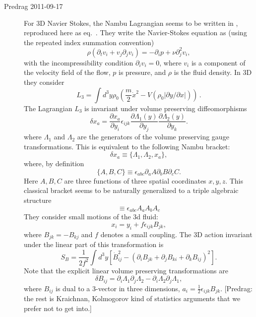 \begin{description}
\item[Predrag 2011-09-17 ]
For 3D Navier Stokes, the Nambu Lagrangian seems to be written in
, reproduced here as eq.~.
They write the Navier-Stokes equation as (using the repeated index summation convention)
\begin{equation}
\rho (\partial_t v_i + v_j \partial_j v_i) = - \partial_i p + \nu \partial_j^2 v_i,
\end{equation}
with the incompressibility condition $\partial_i v_i = 0$, where $v_i$ is
a component of the velocity field of the flow, $p$ is pressure, and
$\rho$ is the fluid density. In 3D they consider
\begin{equation}
L_3= \int d^3y \rho_0
\left( \frac{m}{2} \dot{x}^2 - V( \rho_0 |{ \partial y}/{\partial x}|) \right)
\,.
\label{MiPlSt11:Lagr}
\end{equation}
The Lagrangian $L_3$ is invariant under volume preserving diffeomorphisms
\begin{equation}
\delta x_a = \frac{\partial x_a}{\partial y_i}\epsilon_{ijk} \frac{\partial \Lambda_1(y)}{\partial y_j}
\frac{\partial \Lambda_2(y)}{\partial y_k}.
\end{equation}
where $\Lambda_1$ and $\Lambda_2$ are the generators of the volume preserving
gauge transformations.
This is equivalent to the following Nambu bracket:
\begin{equation}
\delta x_a \equiv \{\Lambda_1, \Lambda_2, x_a\},
\end{equation}
where, by definition
\begin{equation}
\{A, B, C\}\equiv \epsilon_{abc} \partial_a A \partial_b B \partial_c C.
\end{equation}
Here $A,B,C$ are three functions of three spatial coordinates $x,y,z$.
This classical bracket seems to be naturally generalized to a triple
algebraic structure %
\begin{equation}
[A_i, A_j, A_k] \equiv \epsilon_{abc} A_a A_b A_c
\end{equation}
They consider small motions of the 3d fluid:
\begin{equation}
x_i = y_i + f \epsilon_{ijk} B_{jk},
\end{equation}
where $B_{jk}= - B_{kj}$ and $f$ denotes a small coupling.
The 3D action invariant under the linear part of this transformation is
\begin{equation}
S_B = \frac{1}{2 f^2}  \int d^3y [  \dot{B}_{ij}^2 - (\partial_i B_{jk} +\partial_j B_{ki} +\partial_k B_{ij})^2].
\end{equation}
Note that the explicit linear volume preserving transformations are
\begin{equation}
\delta B_{ij} = \partial_i \Lambda_1 \partial_j \Lambda_2 - \partial_i \Lambda_2
\partial_j \Lambda_1,
\end{equation}
where $B_{ij}$  is dual to a 3-vector in three dimensions,
$
a_i = \frac{1}{2} \epsilon_{ijk} B_{jk}
$.
[Predrag: the rest is Kraichnan, Kolmogorov kind of statistics arguments that
we prefer not to get into.]

\end{description}

